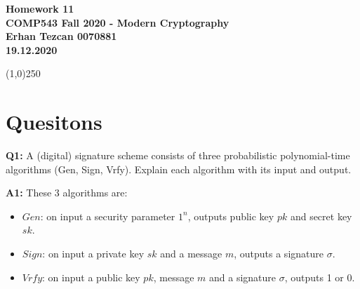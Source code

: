 \documentclass[12pt,reqno]{amsart}
\newcommand{\code}[1]{\texttt{#1}}
\begin{document}
\begin{center}
\large\textbf{Homework 11 \\ COMP543 Fall 2020 - Modern Cryptography \\}
\normalsize\textbf{ Erhan Tezcan 0070881 \\ 19.12.2020} \\
\end{center}

\begin{center}
\line(1,0){250}
\end{center}

%
%

%
%

\section{Quesitons}
\textbf{Q1:} A (digital) signature scheme consists of three probabilistic polynomial-time algorithms (Gen, Sign, Vrfy). Explain each algorithm with its input and output.

\textbf{A1:} These 3 algorithms are:
\begin{itemize}
	\item $Gen$: on input a security parameter $1^n$, outputs public key $pk$ and secret key $sk$.
	\item $Sign$: on input a private key $sk$ and a message $m$, outputs a signature $\sigma$.
	\item $Vrfy$: on input a public key $pk$, message $m$ and a signature $\sigma$, outputs 1 or 0.
\end{itemize}
\end{document}

